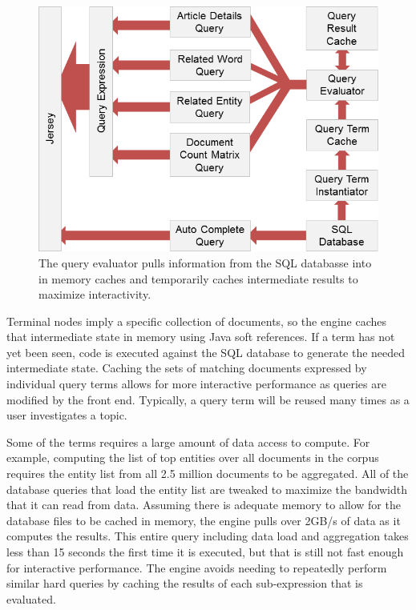 \begin{figure}[htb]
  \centerline{
    \includegraphics[scale=0.28]{figures/pull.png}
  }
  \caption{The query evaluator pulls information from the SQL databasse into in memory caches and temporarily caches intermediate results to maximize interactivity.}
  \label{fig:pull}
\end{figure}


Terminal nodes imply a specific collection of documents, so the engine caches that intermediate state in memory using Java soft references.  If a term has not yet been seen, code is executed against the SQL database to generate the needed intermediate state.  Caching the sets of matching documents expressed by individual query terms allows for more interactive performance as queries are modified by the front end.  Typically, a query term will be reused many times as a user investigates a topic.

Some of the terms requires a large amount of data access to compute.  For example, computing the list of top entities over all documents in the corpus requires the entity list from all 2.5 million documents to be aggregated.  All of the database queries that load the entity list are tweaked to maximize the bandwidth that it can read from data.  Assuming there is adequate memory to allow for the database files to be cached in memory, the engine pulls over 2GB/s of data as it computes the results.  This entire query including data load and aggregation takes less than 15 seconds the first time it is executed, but that is still not fast enough for interactive performance.  The engine avoids needing to repeatedly perform similar hard queries by caching the results of each sub-expression that is evaluated.